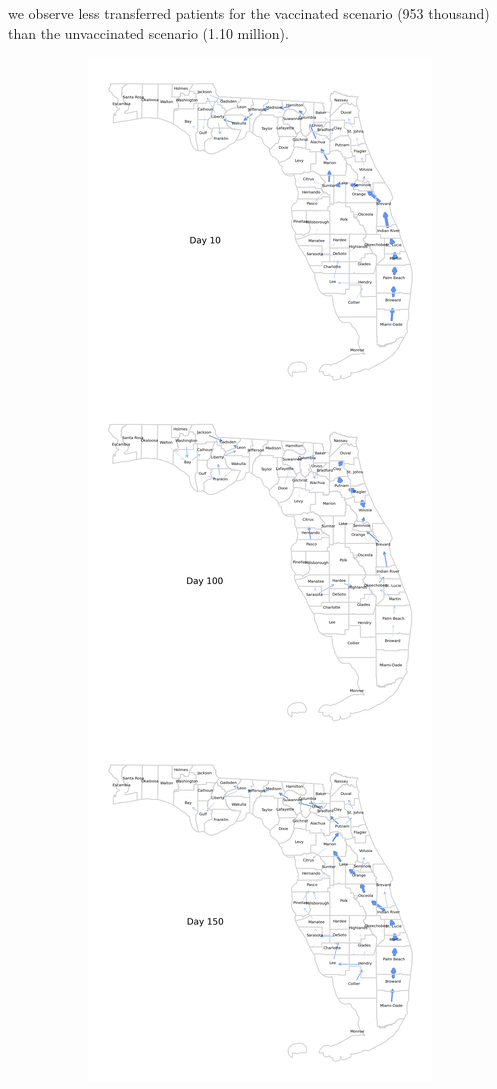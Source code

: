 \documentclass{article}
\begin{document}
we observe less transferred patients for the vaccinated scenario (953 thousand) than the unvaccinated scenario (1.10 million).

\begin{figure}
    \centering
    \begin{subfigure}{0.43\linewidth}
        \centering
        \includegraphics[width=\linewidth]{pics/paperStackedPatientTransfersVax0.1.png}

\end{subfigure}
\end{figure}
\end{document}
